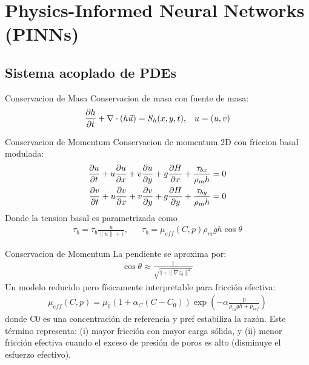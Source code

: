 \documentclass{beamer}
\begin{document}
\section{Physics-Informed Neural Networks (PINNs)}
\subsection{Sistema acoplado de PDEs}
\begin{frame}{Conservacion de Masa}
Conservacion de masa con fuente de masa: 
    \begin{align}
    {\partial h \over \partial t} + \nabla \cdot (h \vec{u}) = S_h(x,y,t), && u=(u,v)
    \end{align}
\end{frame}

\begin{frame}{Conservacion de Momentum}
Conservacion de momentum 2D con friccion basal modulada:
    \begin{align}
    {{\partial u} \over{\partial t}}+u{{\partial u} \over{\partial x}}+v{{\partial u} \over{\partial y}}+g{{\partial H} \over{\partial x}}+{{\tau_{bx}} \over{\rho_mh}} = 0 \\
    {{\partial v} \over{\partial t}}+u{{\partial v} \over{\partial x}}+v{{\partial v} \over{\partial y}}+g{{\partial H} \over{\partial y}}+{{\tau_{by}} \over{\rho_mh}} = 0
    \end{align}
    Donde la tension basal es parametrizada como 
    \begin{align}
    \tau_{b} = \tau_{b}\frac{u}{\|u\|+\epsilon},&&\tau_{b}=\mu_{eff}(C,p)\rho_mgh \cos\theta
    \end{align}
\end{frame}

\begin{frame}{Conservacion de Momentum}
    La pendiente se aproxima por:
    \begin{align}
        \cos\theta\approx \frac{1}{\sqrt{1+\|\nabla z_b\|^2}}
    \end{align}
    Un modelo reducido pero físicamente interpretable para fricción efectiva:
    \begin{align}
        \mu_{eff}(C,p) = \mu_0(1+\alpha_C(C-C_0))\exp(-\alpha \frac{p}{\rho_mgh+p_{ref}})
    \end{align}
    donde C0 es una concentración de referencia y pref estabiliza la razón. Este término representa: (i) mayor fricción con mayor carga sólida, y 
    (ii) menor fricción efectiva cuando el exceso de presión de poros es alto (disminuye el esfuerzo efectivo).

\end{frame}
\end{document}
